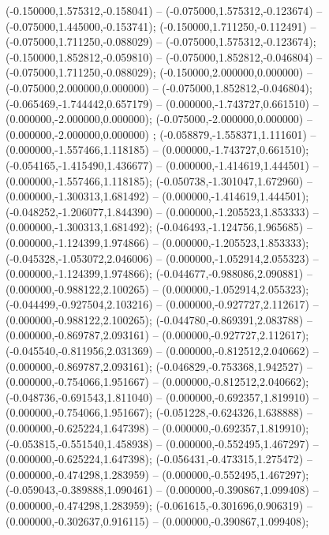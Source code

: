  (-0.150000,1.575312,-0.158041) -- (-0.075000,1.575312,-0.123674) -- (-0.075000,1.445000,-0.153741);
 (-0.150000,1.711250,-0.112491) -- (-0.075000,1.711250,-0.088029) -- (-0.075000,1.575312,-0.123674);
 (-0.150000,1.852812,-0.059810) -- (-0.075000,1.852812,-0.046804) -- (-0.075000,1.711250,-0.088029);
 (-0.150000,2.000000,0.000000) -- (-0.075000,2.000000,0.000000) -- (-0.075000,1.852812,-0.046804);
 (-0.065469,-1.744442,0.657179) -- (0.000000,-1.743727,0.661510) -- (0.000000,-2.000000,0.000000);
 (-0.075000,-2.000000,0.000000) -- (0.000000,-2.000000,0.000000) ;
 (-0.058879,-1.558371,1.111601) -- (0.000000,-1.557466,1.118185) -- (0.000000,-1.743727,0.661510);
 (-0.054165,-1.415490,1.436677) -- (0.000000,-1.414619,1.444501) -- (0.000000,-1.557466,1.118185);
 (-0.050738,-1.301047,1.672960) -- (0.000000,-1.300313,1.681492) -- (0.000000,-1.414619,1.444501);
 (-0.048252,-1.206077,1.844390) -- (0.000000,-1.205523,1.853333) -- (0.000000,-1.300313,1.681492);
 (-0.046493,-1.124756,1.965685) -- (0.000000,-1.124399,1.974866) -- (0.000000,-1.205523,1.853333);
 (-0.045328,-1.053072,2.046006) -- (0.000000,-1.052914,2.055323) -- (0.000000,-1.124399,1.974866);
 (-0.044677,-0.988086,2.090881) -- (0.000000,-0.988122,2.100265) -- (0.000000,-1.052914,2.055323);
 (-0.044499,-0.927504,2.103216) -- (0.000000,-0.927727,2.112617) -- (0.000000,-0.988122,2.100265);
 (-0.044780,-0.869391,2.083788) -- (0.000000,-0.869787,2.093161) -- (0.000000,-0.927727,2.112617);
 (-0.045540,-0.811956,2.031369) -- (0.000000,-0.812512,2.040662) -- (0.000000,-0.869787,2.093161);
 (-0.046829,-0.753368,1.942527) -- (0.000000,-0.754066,1.951667) -- (0.000000,-0.812512,2.040662);
 (-0.048736,-0.691543,1.811040) -- (0.000000,-0.692357,1.819910) -- (0.000000,-0.754066,1.951667);
 (-0.051228,-0.624326,1.638888) -- (0.000000,-0.625224,1.647398) -- (0.000000,-0.692357,1.819910);
 (-0.053815,-0.551540,1.458938) -- (0.000000,-0.552495,1.467297) -- (0.000000,-0.625224,1.647398);
 (-0.056431,-0.473315,1.275472) -- (0.000000,-0.474298,1.283959) -- (0.000000,-0.552495,1.467297);
 (-0.059043,-0.389888,1.090461) -- (0.000000,-0.390867,1.099408) -- (0.000000,-0.474298,1.283959);
 (-0.061615,-0.301696,0.906319) -- (0.000000,-0.302637,0.916115) -- (0.000000,-0.390867,1.099408);
